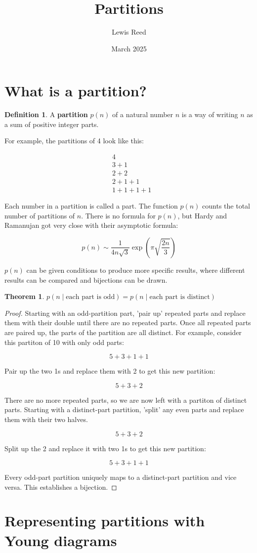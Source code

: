 \documentclass{article}
\title{Partitions}
\author{Lewis Reed}
\date{March 2025}
\theoremstyle{definition}
\newtheorem{definition}{Definition}
\newtheorem{theorem}{Theorem}
\begin{document}
\maketitle

\section{What is a partition?}

\begin{definition}
    A \textbf{partition} $p(n)$ of a natural number $n$ is a way of writing $n$ as a sum of positive integer parts.
\end{definition}

\noindent
For example, the partitions of 4 look like this:

\[
\begin{aligned}
&4 \\
&3 + 1 \\
&2 + 2 \\
&2 + 1 + 1 \\
&1 + 1 + 1 + 1
\end{aligned}
\]

\noindent
Each number in a partition is called a part. The function $p(n)$ counts the total number of partitions of $n$.
There is no formula for $p(n)$, but Hardy and Ramanujan got very close with their asymptotic formula:

\[
p(n) \sim \frac{1}{4n\sqrt{3}}\exp\left(\pi\sqrt{\frac{2n}{3}}\right)
\]

\noindent
$p(n)$ can be given conditions to produce more specific results, where different results can be compared
and bijections can be drawn.

\begin{theorem}
    $p(n \mid \text{each part is odd}) = p(n \mid \text{each part is distinct})$
\end{theorem}
    
\begin{proof}
Starting with an odd-partition part, 'pair up' repeated parts and replace them with their double until there are
no repeated parts. Once all repeated parts are paired up, the parts of the partition are all distinct.
\newline For example, consider this partiton of 10 with only odd parts:

\[
5 + 3 + 1 + 1
\]

\noindent
Pair up the two 1s and replace them with 2 to get this new partition:

\[
5 + 3 + 2
\]

\noindent
There are no more repeated parts, so we are now left with a partiton of distinct parts.
\newline Starting with a distinct-part partition, 'split' any even parts and replace them with their two halves.

\[
5 + 3 + 2
\]

\noindent
Split up the 2 and replace it with two 1s to get this new partition:

\[
5 + 3 + 1 + 1
\]

\noindent
Every odd-part partition uniquely maps to a distinct-part partition and vice versa. This establishes a bijection.
\end{proof}

\newpage

\section{Representing partitions with Young diagrams}
\end{document}
